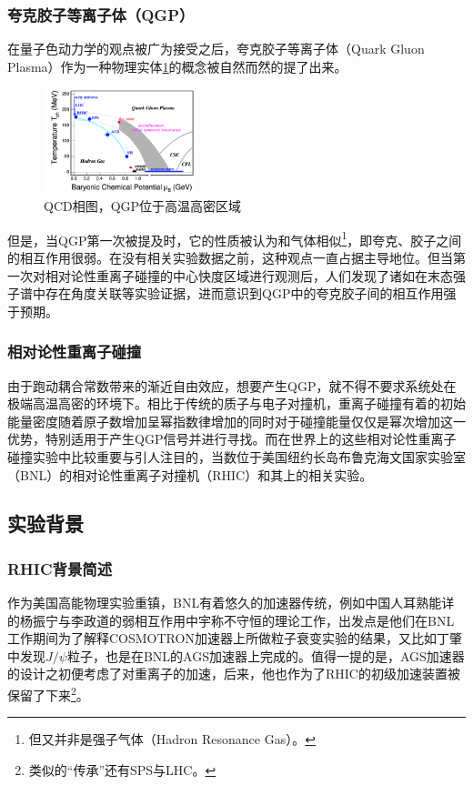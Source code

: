 \documentclass[%
 reprint,
 amsmath,amssymb,
 aps,
]{revtex4-1}
\begin{document}
\subsubsection{\label{sec:QGP}夸克胶子等离子体（QGP）}
在量子色动力学的观点被广为接受之后，夸克胶子等离子体（Quark Gluon Plasma）作为一种物理实体\ref{fig:QCD}的概念被自然而然的提了出来。
\begin{figure}[htbp]
    \includegraphics[width = 0.4\textwidth]{Plots/QCDPD.png}
    \caption{\label{fig:QCD}QCD相图，QGP位于高温高密区域}
\end{figure}
但是，当QGP第一次被提及时，它的性质被认为和气体相似\footnote{但又并非是强子气体（Hadron Resonance Gas）。}，即夸克、胶子之间的相互作用很弱。在没有相关实验数据之前，这种观点一直占据主导地位。但当第一次对相对论性重离子碰撞的中心快度区域进行观测后，人们发现了诸如在末态强子谱中存在角度关联等实验证据，进而意识到QGP中的夸克胶子间的相互作用强于预期。
\subsubsection{\label{sec:HIC}相对论性重离子碰撞}
由于跑动耦合常数带来的渐近自由效应，想要产生QGP，就不得不要求系统处在极端高温高密的环境下。相比于传统的质子与电子对撞机，重离子碰撞有着的初始能量密度随着原子数增加呈幂指数律增加的同时对于碰撞能量仅仅是幂次增加这一优势，特别适用于产生QGP信号并进行寻找。而在世界上的这些相对论性重离子碰撞实验中比较重要与引人注目的，当数位于美国纽约长岛布鲁克海文国家实验室（BNL）的相对论性重离子对撞机（RHIC）和其上的相关实验。
\subsection{\label{sec:ExpBG}实验背景}
\subsubsection{\label{sec:RHICBg}RHIC背景简述}
作为美国高能物理实验重镇，BNL有着悠久的加速器传统，例如中国人耳熟能详的杨振宁与李政道的弱相互作用中宇称不守恒的理论工作，出发点是他们在BNL工作期间为了解释COSMOTRON加速器上所做粒子衰变实验的结果，又比如丁肇中发现$J/\psi$粒子，也是在BNL的AGS加速器上完成的。值得一提的是，AGS加速器的设计之初便考虑了对重离子的加速，后来，他也作为了RHIC的初级加速装置被保留了下来\footnote{类似的“传承”还有SPS与LHC。}。
\end{document}
